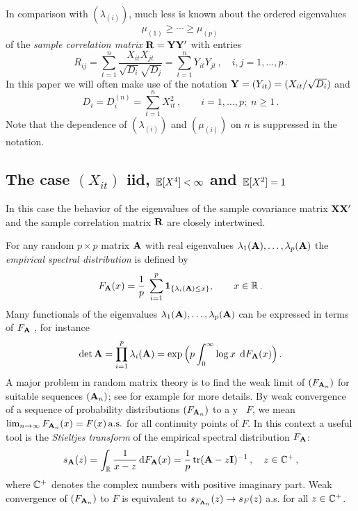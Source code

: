 In comparison with $(\lambda_{(i)})$, much less is known about the ordered eigenvalues
\begin{equation*}
\mu_{(1)} \ge \cdots \ge\mu_{(p)}\,
\end{equation*} 
of the {\em sample correlation matrix} ${\mathbf R}={\mathbf Y}{\mathbf Y}'$ with entries
\begin{equation}\label{eq:corrR}
R_{ij}=\sum_{t=1}^n \frac{X_{it}X_{jt}}{\sqrt{D_i} \sqrt{D_j}} = \sum_{t=1}^n Y_{it}Y_{jt}\,, \quad i,j=1,\ldots,p\,.
\end{equation}
In this paper we will often make use of the notation ${\mathbf Y}=(Y_{it})=(X_{it}/\sqrt{D_i})$ and
\begin{equation}\label{eq:D}
D_i=D_i^{(n)}=\sum_{t=1}^n X_{it}^2\,, \qquad
i=1,\ldots,p;\;  n\ge 1\,.
\end{equation} 
Note that the dependence of $(\lambda_{(i)})$ and $(\mu_{(i)})$ on $n$ is suppressed in the notation.


\subsection{The case $(X_{it})$ iid, $\mathbb{E}[X^4]<\infty$ and $\mathbb{E}[X^2]=1$}  

In this case the behavior of the eigenvalues of the sample covariance matrix ${\mathbf X}{\mathbf X}'$ and the sample correlation matrix ${\mathbf R}$ are closely intertwined. 
\par 

For any random $p\times p$ matrix ${\mathbf A}$ with real eigenvalues $\lambda_1({\mathbf A}),\ldots,\lambda_p({\mathbf A})$ the {\em empirical spectral distribution} is defined by 
\begin{equation*}
F_{{\mathbf A}}(x)= \frac{1}{p}\; \sum_{i=1}^p \mathbf{1}_{\{ \lambda_i({\mathbf A})\le x \}}, \qquad x\in  \mathbb{R}\,.
\end{equation*}
Many functionals of the eigenvalues $\lambda_1({\mathbf A}),\ldots,\lambda_p({\mathbf A})$ can be expressed in terms of $F_{{\mathbf A}}$ \cite{bai:fang:liang:2014}, for instance
\begin{equation*}
\det {\mathbf A} = \prod_{i=1}^p \lambda_i({\mathbf A}) = \exp \Big( p \int_{0}^{\infty} \log x \;\,\mathrm{d} F_{{\mathbf A}}(x) \Big)\,.
\end{equation*}
A major problem in random matrix theory is to find the weak limit of $(F_{{\mathbf A}_n})$ for suitable sequences $({\mathbf A}_n)$; see for example \cite{bai:silverstein:2010,yao:zheng:bai:2015} for more details. By weak convergence of a sequence of probability distributions $(F_{{\mathbf A}_n})$ 
to a \pro y \ds\ $F$, we mean $\lim_{n \to \infty} F_{{\mathbf A}_n}(x)=F(x) \,{\rm a.s.}$ for all continuity points of $F$.
In this context a useful tool is the {\em Stieltjes transform}
of the empirical spectral distribution $F_{{\mathbf A}}$:
\begin{equation*}
s_{{\mathbf A}}(z)= \int_{\mathbb{R}} \frac{1}{x-z} \,\mathrm{d} F_{{\mathbf A}}(x) = \frac{1}{p} \operatorname{tr}({\mathbf A} -z {\mathbf I})^{-1}\,, \quad z\in \mathbb{C}^+\,,
\end{equation*}
where $\mathbb{C}^+$ denotes the complex numbers with positive imaginary part. 
Weak convergence of $(F_{{\mathbf A}_n})$ to $F$ is equivalent to $s_{F_{{\mathbf A}_n}}(z) \to s_F(z)$ a.s. for all $z\in \mathbb{C}^+$.

